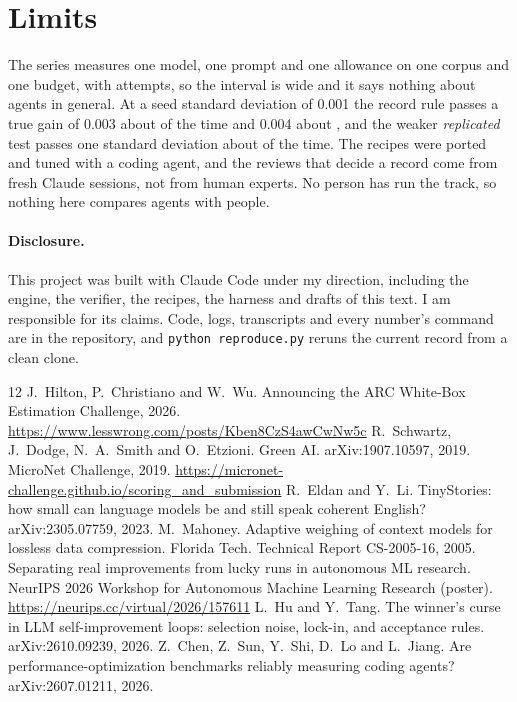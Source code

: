\documentclass[11pt]{article}
\begin{document}
\section{Limits}
The series measures one model, one prompt and one allowance on one corpus and one budget, with \vattempts{} attempts, so the interval is wide and it says nothing about agents in general. At a seed standard deviation of 0.001 the record rule passes a true gain of 0.003 about \vruleOOO{} of the time and 0.004 about \vruleOOF{}, and the weaker \emph{replicated} test passes one standard deviation about \vreppower{} of the time. The recipes were ported and tuned with a coding agent, and the reviews that decide a record come from fresh Claude sessions, not from human experts. No person has run the track, so nothing here compares agents with people.

\paragraph{Disclosure.} This project was built with Claude Code under my direction, including the engine, the verifier, the recipes, the harness and drafts of this text. I am responsible for its claims. Code, logs, transcripts and every number's command are in the repository, and \texttt{python reproduce.py} reruns the current record from a clean clone.

\begin{thebibliography}{12}\small
{} J.~Hilton, P.~Christiano and W.~Wu. Announcing the ARC White-Box Estimation Challenge, 2026. \url{https://www.lesswrong.com/posts/Kben8CzS4awCwNw5c}
 R.~Schwartz, J.~Dodge, N.~A.~Smith and O.~Etzioni. Green AI. arXiv:1907.10597, 2019.
 MicroNet Challenge, 2019. \url{https://micronet-challenge.github.io/scoring_and_submission}
 R.~Eldan and Y.~Li. TinyStories: how small can language models be and still speak coherent English? arXiv:2305.07759, 2023.
 M.~Mahoney. Adaptive weighing of context models for lossless data compression. Florida Tech. Technical Report CS-2005-16, 2005.
 Separating real improvements from lucky runs in autonomous ML research. NeurIPS 2026 Workshop for Autonomous Machine Learning Research (poster). \url{https://neurips.cc/virtual/2026/157611}
 L.~Hu and Y.~Tang. The winner's curse in LLM self-improvement loops: selection noise, lock-in, and acceptance rules. arXiv:2610.09239, 2026.
 Z.~Chen, Z.~Sun, Y.~Shi, D.~Lo and L.~Jiang. Are performance-optimization benchmarks reliably measuring coding agents? arXiv:2607.01211, 2026.
\end{thebibliography}
\end{document}
